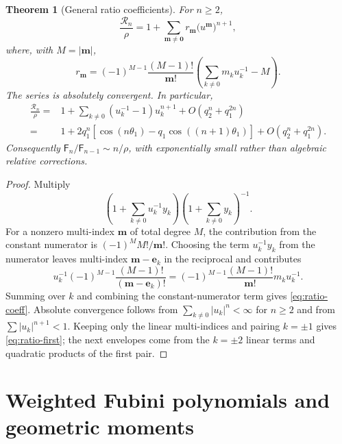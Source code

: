 \documentclass[11pt,a4paper,oneside]{article}
\newtheorem{theorem}{Theorem}[section]
\theoremstyle{definition}
\theoremstyle{remark}
\newcommand{\Fub}{\mathsf{F}}
\begin{document}
\begin{theorem}[General ratio coefficients]\label{thm:ratio}
For $n\ge2$,
\begin{equation}\label{eq:ratio-multi}
 \frac{\mathcal R_n}{\rho}
 =1+\sum_{\bm m\ne\bm0}r_{\bm m}
      \bigl(u^{\bm m}\bigr)^{n+1},
\end{equation}
where, with $M=|\bm m|$,
\begin{equation}\label{eq:ratio-coeff}
 \boxed{\displaystyle
 r_{\bm m}=(-1)^{M-1}\frac{(M-1)!}{\bm m!}
 \left(\sum_{k\ne0}m_ku_k^{-1}-M\right).}
\end{equation}
The series is absolutely convergent.  In particular,
\begin{align}
 \frac{\mathcal R_n}{\rho}
 ={}&1+\sum_{k\ne0}(u_k^{-1}-1)u_k^{n+1}
 +O\!\left(q_2^n+q_1^{2n}\right)\nonumber\\
 ={}&1+2q_1^n\left[
 \cos(n\theta_1)-q_1\cos((n+1)\theta_1)
 \right]
 +O\!\left(q_2^n+q_1^{2n}\right).
 \label{eq:ratio-first}
\end{align}
Consequently
\(
 \Fub_n/\Fub_{n-1}\sim n/\rho
\), with exponentially small rather than algebraic relative corrections.
\end{theorem}

\begin{proof}
Multiply
\[
 \left(1+\sum_{k\ne0}u_k^{-1}y_k\right)
 \left(1+\sum_{k\ne0}y_k\right)^{-1}.
\]
For a nonzero multi-index $\bm m$ of total degree $M$, the contribution from
the constant numerator is
$(-1)^MM!/\bm m!$.  Choosing the term $u_k^{-1}y_k$ from the numerator leaves
multi-index $\bm m-\bm e_k$ in the reciprocal and contributes
\[
 u_k^{-1}(-1)^{M-1}\frac{(M-1)!}{(\bm m-\bm e_k)!}
 =(-1)^{M-1}\frac{(M-1)!}{\bm m!}m_ku_k^{-1}.
\]
Summing over $k$ and combining the constant-numerator term gives
\cref{eq:ratio-coeff}.  Absolute convergence follows from
$\sum_{k\ne0}|u_k|^n<\infty$ for $n\ge2$ and from
$\sum|u_k|^{n+1}<1$.  Keeping only the linear multi-indices and pairing
$k=\pm1$ gives \cref{eq:ratio-first}; the next envelopes come from the
$k=\pm2$ linear terms and quadratic products of the first pair.
\end{proof}

\section{Weighted Fubini polynomials and geometric moments}
\label{sec:weighted}
\end{document}
